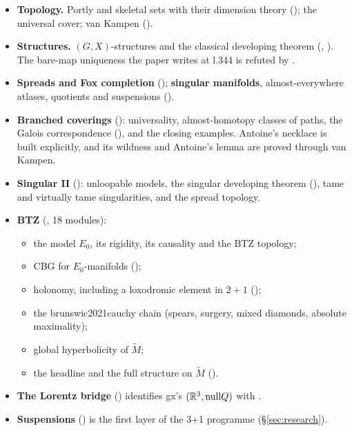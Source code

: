 \begin{itemize}
\item \textbf{Topology.} Portly and skeletal sets with their dimension theory
  (); the universal cover; van Kampen ().
\item \textbf{Structures.} $(G,X)$-structures and the classical developing theorem
  (, ). The bare-map uniqueness the paper
  writes at l.344 is refuted by .
\item \textbf{Spreads and Fox completion} (); \textbf{singular manifolds},
  almost-everywhere atlases, quotients and suspensions ().
\item \textbf{Branched coverings} (): universality, almost-homotopy classes
  of paths, the Galois correspondence (), and the closing
  examples. Antoine's necklace is built explicitly, and its wildness and Antoine's lemma are
  proved through van Kampen.
\item \textbf{Singular II} (): unloopable models, the singular developing
  theorem (), tame and virtually tame singularities, and
  the spread topology.
\item \textbf{BTZ} (, 18 modules):
  \begin{itemize}
  \item the model $E_0$, its rigidity, its causality and the BTZ topology;
  \item CBG for $E_0$-manifolds ();
  \item holonomy, including a loxodromic element in $2+1$ ();
  \item the brunswic2021cauchy chain (spears, surgery, mixed diamonds, absolute maximality);
  \item global hyperbolicity of $\widetilde M$;
  \item the headline  and the full structure on $\widetilde M$
    ().
  \end{itemize}
\item \textbf{The Lorentz bridge} () identifies gx's
  $(\mathbb{R}^3,\mathrm{null}Q)$ with .
\item \textbf{Suspensions} () is the first layer
  of the 3+1 programme (\S\ref{sec:research}).
\end{itemize}

